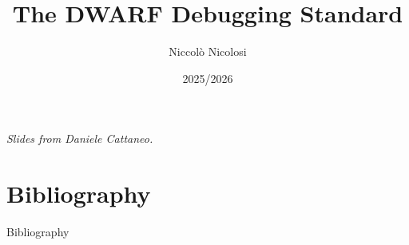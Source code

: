 

\author{Niccolò Nicolosi}
\date{2025/2026}
\title{The DWARF Debugging Standard}
\newcommand{\customdata}{Niccolò Nicolosi}





\begin{frame}
\maketitle
\begin{center}
\itshape\scriptsize
Slides from Daniele Cattaneo.
\end{center}
\end{frame}










\section*{Bibliography}
\begin{frame}[allowframebreaks]{Bibliography}
\nocite{*}


\end{frame}


